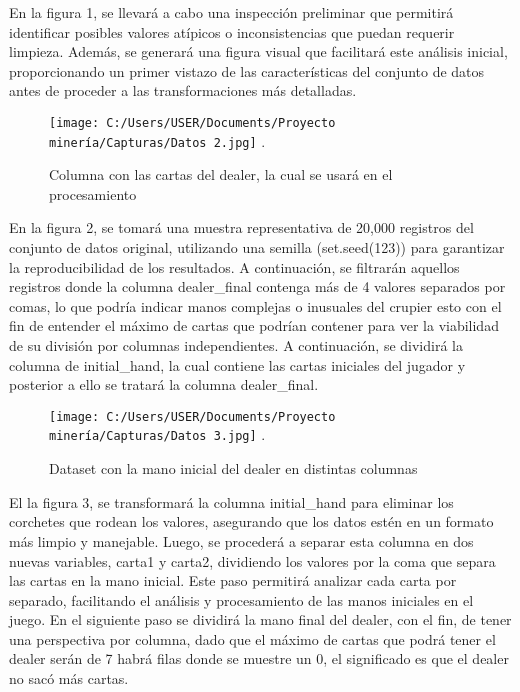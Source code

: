 \documentclass[conference,final,]{IEEEtran}
\begin{document}
En la figura 1, se llevará a cabo una inspección preliminar que
permitirá identificar posibles valores atípicos o inconsistencias que
puedan requerir limpieza. Además, se generará una figura visual que
facilitará este análisis inicial, proporcionando un primer vistazo de
las características del conjunto de datos antes de proceder a las
transformaciones más detalladas.

\begin{figure}[htbp]
\centering
\texttt{[image: C:/Users/USER/Documents/Proyecto minería/Capturas/Datos 2.jpg]}
\DeclareGraphicsExtensions.
\caption{Columna con las cartas del dealer, la cual se usará en el procesamiento}
\label{Dataset 2}
\end{figure}

En la figura 2, se tomará una muestra representativa de 20,000 registros
del conjunto de datos original, utilizando una semilla (set.seed(123))
para garantizar la reproducibilidad de los resultados. A continuación,
se filtrarán aquellos registros donde la columna dealer\_final contenga
más de 4 valores separados por comas, lo que podría indicar manos
complejas o inusuales del crupier esto con el fin de entender el máximo
de cartas que podrían contener para ver la viabilidad de su división por
columnas independientes. A continuación, se dividirá la columna de
initial\_hand, la cual contiene las cartas iniciales del jugador y
posterior a ello se tratará la columna dealer\_final.

\begin{figure}[htbp]
\centering
\texttt{[image: C:/Users/USER/Documents/Proyecto minería/Capturas/Datos 3.jpg]}
\DeclareGraphicsExtensions.
\caption{Dataset con la mano inicial del dealer en distintas columnas}
\label{Dataset 3}
\end{figure}

El la figura 3, se transformará la columna initial\_hand para eliminar
los corchetes que rodean los valores, asegurando que los datos estén en
un formato más limpio y manejable. Luego, se procederá a separar esta
columna en dos nuevas variables, carta1 y carta2, dividiendo los valores
por la coma que separa las cartas en la mano inicial. Este paso
permitirá analizar cada carta por separado, facilitando el análisis y
procesamiento de las manos iniciales en el juego. En el siguiente paso
se dividirá la mano final del dealer, con el fin, de tener una
perspectiva por columna, dado que el máximo de cartas que podrá tener el
dealer serán de 7 habrá filas donde se muestre un 0, el significado es
que el dealer no sacó más cartas.
\end{document}
